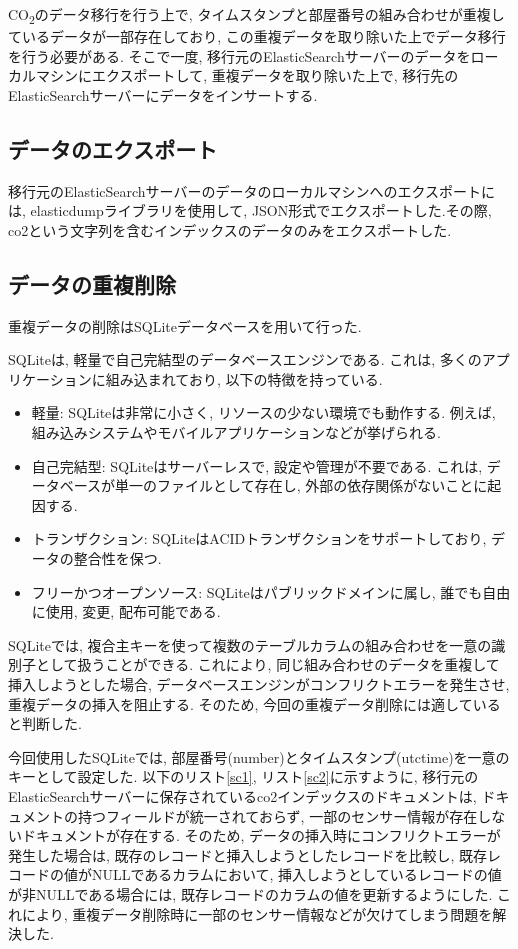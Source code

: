 CO\textsubscript{2}のデータ移行を行う上で, タイムスタンプと部屋番号の組み合わせが重複しているデータが一部存在しており, この重複データを取り除いた上でデータ移行を行う必要がある. そこで一度, 移行元のElasticSearchサーバーのデータをローカルマシンにエクスポートして, 重複データを取り除いた上で, 移行先のElasticSearchサーバーにデータをインサートする.

\subsection{データのエクスポート}
移行元のElasticSearchサーバーのデータのローカルマシンへのエクスポートには, elasticdumpライブラリを使用して, JSON形式でエクスポートした.その際, co2という文字列を含むインデックスのデータのみをエクスポートした.

\subsection{データの重複削除}
重複データの削除はSQLiteデータベースを用いて行った.

SQLiteは, 軽量で自己完結型のデータベースエンジンである. これは, 多くのアプリケーションに組み込まれており, 以下の特徴を持っている.

\begin{itemize}
  \item 軽量: SQLiteは非常に小さく, リソースの少ない環境でも動作する. 例えば, 組み込みシステムやモバイルアプリケーションなどが挙げられる.
  \item 自己完結型: SQLiteはサーバーレスで, 設定や管理が不要である. これは, データベースが単一のファイルとして存在し, 外部の依存関係がないことに起因する.
  \item 
        トランザクション: SQLiteはACIDトランザクションをサポートしており, データの整合性を保つ. 
  \item 
        フリーかつオープンソース: SQLiteはパブリックドメインに属し, 誰でも自由に使用, 変更, 配布可能である.
\end{itemize}

SQLiteでは, 複合主キーを使って複数のテーブルカラムの組み合わせを一意の識別子として扱うことができる. これにより, 同じ組み合わせのデータを重複して挿入しようとした場合, データベースエンジンがコンフリクトエラーを発生させ, 重複データの挿入を阻止する. そのため, 今回の重複データ削除には適していると判断した.

今回使用したSQLiteでは, 部屋番号(number)とタイムスタンプ(utctime)を一意のキーとして設定した. 以下のリスト\ref{sc1}, リスト\ref{sc2}に示すように, 移行元のElasticSearchサーバーに保存されているco2インデックスのドキュメントは, ドキュメントの持つフィールドが統一されておらず, 一部のセンサー情報が存在しないドキュメントが存在する. そのため, データの挿入時にコンフリクトエラーが発生した場合は, 既存のレコードと挿入しようとしたレコードを比較し, 既存レコードの値がNULLであるカラムにおいて, 挿入しようとしているレコードの値が非NULLである場合には, 既存レコードのカラムの値を更新するようにした. これにより, 重複データ削除時に一部のセンサー情報などが欠けてしまう問題を解決した.

